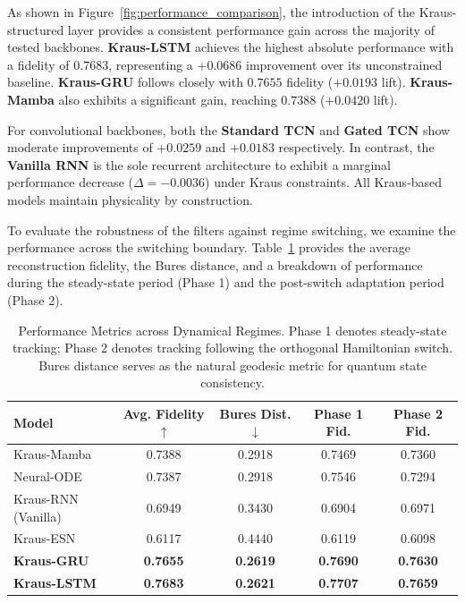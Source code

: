 \documentclass{article} %
\begin{document}
As shown in Figure~\ref{fig:performance_comparison}, the introduction of the Kraus-structured layer provides a consistent performance gain across the majority of tested backbones. \textbf{Kraus-LSTM} achieves the highest absolute performance with a fidelity of $0.7683$, representing a $+0.0686$ improvement over its unconstrained baseline. \textbf{Kraus-GRU} follows closely with $0.7655$ fidelity ($+0.0193$ lift). \textbf{Kraus-Mamba} also exhibits a significant gain, reaching $0.7388$ ($+0.0420$ lift). 

For convolutional backbones, both the \textbf{Standard TCN} and \textbf{Gated TCN} show moderate improvements of $+0.0259$ and $+0.0183$ respectively. In contrast, the \textbf{Vanilla RNN} is the sole recurrent architecture to exhibit a marginal performance decrease ($\Delta = -0.0036$) under Kraus constraints.
All Kraus-based models maintain physicality by construction.

To evaluate the robustness of the filters against regime switching, we examine the performance across the switching boundary. Table~\ref{tab:phase_results} provides the average reconstruction fidelity, the Bures distance, and a breakdown of performance during the steady-state period (Phase 1) and the post-switch adaptation period (Phase 2).

\begin{table}[h]
\centering
\caption{Performance Metrics across Dynamical Regimes. Phase 1 denotes steady-state tracking; Phase 2 denotes tracking following the orthogonal Hamiltonian switch. Bures distance serves as the natural geodesic metric for quantum state consistency.}
\label{tab:phase_results}
\small
\begin{tabular}{lcccc}
\toprule
\textbf{Model} & \textbf{Avg. Fidelity} $\uparrow$ & \textbf{Bures Dist.} $\downarrow$ & \textbf{Phase 1 Fid.} & \textbf{Phase 2 Fid.} \\
\midrule
Kraus-Mamba          & 0.7388 & 0.2918 & 0.7469 & 0.7360 \\
Neural-ODE     & 0.7387 & 0.2918 & 0.7546 & 0.7294 \\
Kraus-RNN (Vanilla)  & 0.6949 & 0.3430 & 0.6904 & 0.6971 \\
Kraus-ESN            & 0.6117 & 0.4440 & 0.6119 & 0.6098 \\
\textbf{Kraus-GRU}   & \textbf{0.7655} & \textbf{0.2619} & \textbf{0.7690} & \textbf{0.7630} \\
\textbf{Kraus-LSTM}  & \textbf{0.7683} & \textbf{0.2621} & \textbf{0.7707} & \textbf{0.7659} \\
\bottomrule
\end{tabular}
\end{table}
\end{document}
